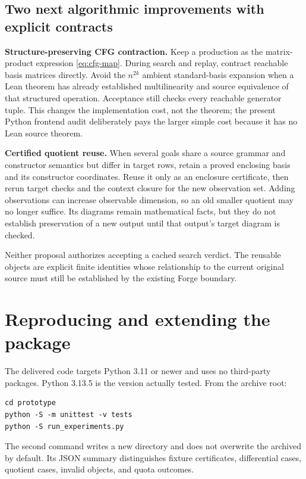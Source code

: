 \documentclass[11pt,letterpaper]{article}
\theoremstyle{definition}\newtheorem{definition}[theorem]{Definition}
\theoremstyle{remark}\newtheorem{remark}[theorem]{Remark}
\begin{document}
\subsection{Two next algorithmic improvements with explicit contracts}
\textbf{Structure-preserving CFG contraction.} Keep a production as the matrix-product expression \eqref{eq:cfg-map}. During search and replay, contract reachable basis matrices directly. Avoid the $n^{2k}$ ambient standard-basis expansion when a Lean theorem has already established multilinearity and source equivalence of that structured operation. Acceptance still checks every reachable generator tuple. This changes the implementation cost, not the theorem; the present Python frontend audit deliberately pays the larger simple cost because it has no Lean source theorem.

\textbf{Certified quotient reuse.} When several goals share a source grammar and constructor semantics but differ in target rows, retain a proved enclosing basis and its constructor coordinates. Reuse it only as an enclosure certificate, then rerun target checks and the context closure for the new observation set. Adding observations can increase observable dimension, so an old smaller quotient may no longer suffice. Its diagrams remain mathematical facts, but they do not establish preservation of a new output until that output's target diagram is checked.

Neither proposal authorizes accepting a cached search verdict. The reusable objects are explicit finite identities whose relationship to the current original source must still be established by the existing Forge boundary.

\section{Reproducing and extending the package}
\label{sec:reproduce}
The delivered code targets Python 3.11 or newer and uses no third-party packages. Python 3.13.5 is the version actually tested. From the archive root:
\begin{lstlisting}
cd prototype
python -S -m unittest -v tests
python -S run_experiments.py
\end{lstlisting}
The second command writes a new  directory and does not overwrite the archived  by default. Its JSON summary distinguishes fixture certificates, differential cases, quotient cases, invalid objects, and quota outcomes.
\end{document}
